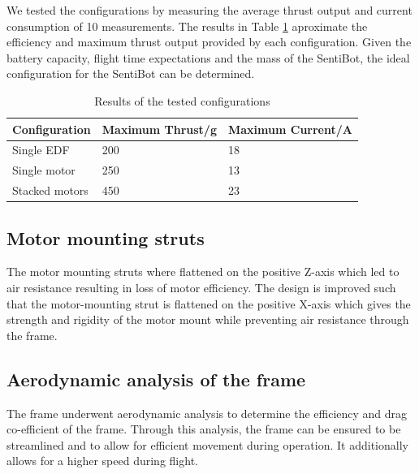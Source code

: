 \documentclass[12pt]{article}
\begin{document}
We tested the configurations by measuring the average thrust output and current consumption of 10 measurements. The results in Table \ref{tab:configs} aproximate the efficiency and maximum thrust output provided by each configuration. Given the battery capacity, flight time expectations and the mass of the SentiBot, the ideal configuration for the SentiBot can be determined.

\begin{table}[h]
	\centering
	\begin{tabular}{ | l | l | l | }
		Configuration & Maximum Thrust/g & Maximum Current/A \\
		\hline
		Single EDF & 200 & 18 \\
		Single motor & 250 & 13 \\
		Stacked motors & 450 & 23 \\
	\end{tabular}
	\caption{Results of the tested configurations}
	\label{tab:configs}
\end{table}

\subsection{Motor mounting struts}

The motor mounting struts where flattened on the positive Z-axis which led to air resistance resulting in loss of motor efficiency. The design is improved such that the motor-mounting strut is flattened on the positive X-axis which gives the strength and rigidity of the motor mount while preventing air resistance through the frame.

\subsection{Aerodynamic analysis of the frame}

The frame underwent aerodynamic analysis to determine the efficiency and drag co-efficient of the frame. Through this analysis, the frame can be ensured to be streamlined and to allow for efficient movement during operation. It additionally allows for a higher speed during flight.
\end{document}
